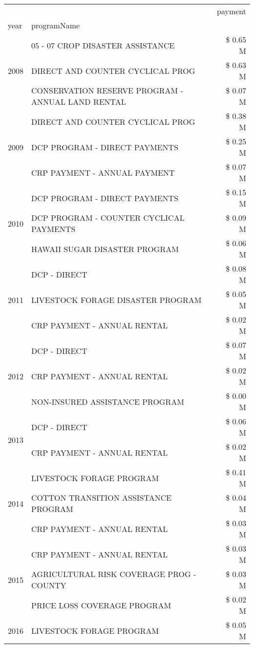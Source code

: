 \begin{tabular}{llr}
\toprule
 &  & payment \\
year & programName &  \\
\midrule
\multirow[t]{3}{*}{2008} & 05 - 07 CROP DISASTER ASSISTANCE & \$ 0.65 M \\
 & DIRECT AND COUNTER CYCLICAL PROG & \$ 0.63 M \\
 & CONSERVATION RESERVE PROGRAM - ANNUAL LAND RENTAL & \$ 0.07 M \\
\cline{1-3}
\multirow[t]{3}{*}{2009} & DIRECT AND COUNTER CYCLICAL PROG & \$ 0.38 M \\
 & DCP PROGRAM - DIRECT PAYMENTS & \$ 0.25 M \\
 & CRP PAYMENT - ANNUAL PAYMENT & \$ 0.07 M \\
\cline{1-3}
\multirow[t]{3}{*}{2010} & DCP PROGRAM - DIRECT PAYMENTS & \$ 0.15 M \\
 & DCP PROGRAM - COUNTER CYCLICAL PAYMENTS & \$ 0.09 M \\
 & HAWAII SUGAR DISASTER PROGRAM & \$ 0.06 M \\
\cline{1-3}
\multirow[t]{3}{*}{2011} & DCP - DIRECT & \$ 0.08 M \\
 & LIVESTOCK FORAGE DISASTER PROGRAM & \$ 0.05 M \\
 & CRP PAYMENT - ANNUAL RENTAL & \$ 0.02 M \\
\cline{1-3}
\multirow[t]{3}{*}{2012} & DCP - DIRECT & \$ 0.07 M \\
 & CRP PAYMENT - ANNUAL RENTAL & \$ 0.02 M \\
 & NON-INSURED ASSISTANCE PROGRAM & \$ 0.00 M \\
\cline{1-3}
\multirow[t]{2}{*}{2013} & DCP - DIRECT & \$ 0.06 M \\
 & CRP PAYMENT - ANNUAL RENTAL & \$ 0.02 M \\
\cline{1-3}
\multirow[t]{3}{*}{2014} & LIVESTOCK FORAGE PROGRAM & \$ 0.41 M \\
 & COTTON TRANSITION ASSISTANCE PROGRAM & \$ 0.04 M \\
 & CRP PAYMENT - ANNUAL RENTAL & \$ 0.03 M \\
\cline{1-3}
\multirow[t]{3}{*}{2015} & CRP PAYMENT - ANNUAL RENTAL & \$ 0.03 M \\
 & AGRICULTURAL RISK COVERAGE PROG - COUNTY & \$ 0.03 M \\
 & PRICE LOSS COVERAGE PROGRAM & \$ 0.02 M \\
\cline{1-3}
\multirow[t]{3}{*}{2016} & LIVESTOCK FORAGE PROGRAM                      & \$ 0.05 M \\

\end{tabular}
